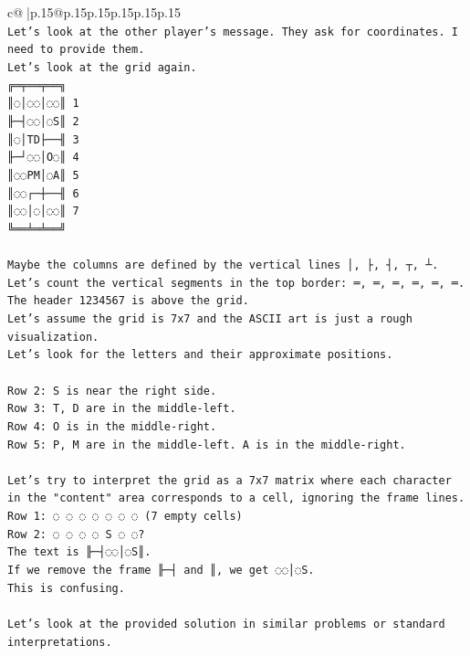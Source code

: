 \documentclass{article}
\begin{document}
{\begin{supertabular}{c@{$\;$}|p{.15\linewidth}@{}p{.15\linewidth}p{.15\linewidth}p{.15\linewidth}p{.15\linewidth}p{.15\linewidth}}
{{{\\ 
\texttt{Let's look at the other player's message. They ask for coordinates. I need to provide them.} \\
\texttt{Let's look at the grid again.} \\
\texttt{╔═╤══╤══╗} \\
\texttt{║◌│◌◌│◌◌║ 1} \\
\texttt{╟─┤◌◌│◌S║ 2} \\
\texttt{║◌│TD├──╢ 3} \\
\texttt{╟─┘◌◌│O◌║ 4} \\
\texttt{║◌◌PM│◌A║ 5} \\
\texttt{║◌◌┌─┼──╢ 6} \\
\texttt{║◌◌│◌│◌◌║ 7} \\
\texttt{╚══╧═╧══╝} \\
\\ 
\texttt{Maybe the columns are defined by the vertical lines │, ├, ┤, ┬, ┴.} \\
\texttt{Let's count the vertical segments in the top border: ═, ═, ═, ═, ═, ═.} \\
\texttt{The header 1234567 is above the grid.} \\
\texttt{Let's assume the grid is 7x7 and the ASCII art is just a rough visualization.} \\
\texttt{Let's look for the letters and their approximate positions.} \\
\\ 
\texttt{Row 2: S is near the right side.} \\
\texttt{Row 3: T, D are in the middle{-}left.} \\
\texttt{Row 4: O is in the middle{-}right.} \\
\texttt{Row 5: P, M are in the middle{-}left. A is in the middle{-}right.} \\
\\ 
\texttt{Let's try to interpret the grid as a 7x7 matrix where each character in the "content" area corresponds to a cell, ignoring the frame lines.} \\
\texttt{Row 1: ◌ ◌ ◌ ◌ ◌ ◌ ◌ (7 empty cells)} \\
\texttt{Row 2: ◌ ◌ ◌ ◌ S ◌ ◌?} \\
\texttt{The text is ╟─┤◌◌│◌S║.} \\
\texttt{If we remove the frame ╟─┤ and ║, we get ◌◌│◌S.} \\
\texttt{This is confusing.} \\
\\ 
\texttt{Let's look at the provided solution in similar problems or standard interpretations.} \\
}}}
\end{supertabular}}
\end{document}
